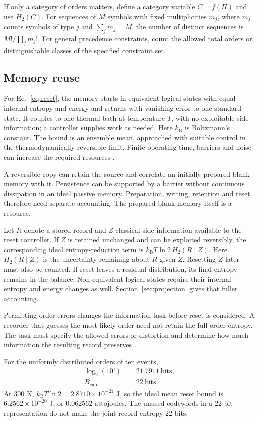 \documentclass[10pt,a4paper,twocolumn]{article}
\newcommand{\kB}{k_{\mathrm B}}
\numberwithin{equation}{section}
\begin{document}
If only a category of orders matters, define a category variable $C=f(\Pi)$ and use $H_2(C)$. For sequences of $M$ symbols with fixed multiplicities $m_j$, where $m_j$ counts symbols of type $j$ and $\sum_jm_j=M$, the number of distinct sequences is $M!/\prod_jm_j!$. For general precedence constraints, count the allowed total orders or distinguishable classes of the specified constraint set.

\subsection{Memory reuse}

For Eq.~\eqref{eq:reset}, the memory starts in equivalent logical states with equal internal entropy and energy and returns with vanishing error to one standard state. It couples to one thermal bath at temperature $T$, with no exploitable side information; a controller supplies work as needed. Here $\kB$ is Boltzmann's constant. The bound is an ensemble mean, approached with suitable control in the thermodynamically reversible limit. Finite operating time, barriers and noise can increase the required resources \cite{landauer1961,bennett1982}.

A reversible copy can retain the source and correlate an initially prepared blank memory with it. Persistence can be supported by a barrier without continuous dissipation in an ideal passive memory. Preparation, writing, retention and reset therefore need separate accounting. The prepared blank memory itself is a resource.

Let $R$ denote a stored record and $Z$ classical side information available to the reset controller. If $Z$ is retained unchanged and can be exploited reversibly, the corresponding ideal entropy-reduction term is $\kB T\ln 2\,H_2(R\mid Z)$. Here $H_2(R\mid Z)$ is the uncertainty remaining about $R$ given $Z$. Resetting $Z$ later must also be counted. If reset leaves a residual distribution, its final entropy remains in the balance. Non-equivalent logical states require their internal entropy and energy changes as well. Section~\ref{sec:projection} gives that fuller accounting.

Permitting order errors changes the information task before reset is considered. A recorder that guesses the most likely order need not retain the full order entropy. The task must specify the allowed errors or distortion and determine how much information the resulting record preserves \cite{coverthomas}.

For the uniformly distributed orders of ten events,
\begin{align}
\log_2(10!)&=21.7911\ \text{bits},\nonumber\\
B_{\mathrm{cap}}&=22\ \text{bits}.
\end{align}
At $300$ K, $\kB T\ln2=2.8710\times10^{-21}$ J, so the ideal mean reset bound is $6.2562\times10^{-20}$ J, or $0.062562$ attojoules. The unused codewords in a 22-bit representation do not make the joint record entropy 22 bits.
\end{document}

